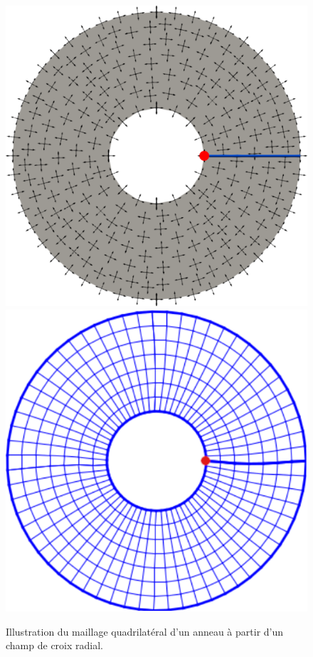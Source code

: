 \begin{figure}[!h]
\centering
\includegraphics[scale=0.3]{images/anneau_cross.pdf}\hfill
\includegraphics[scale=0.89]{images/anneau_mail.pdf}
\caption{Illustration du maillage quadrilatéral d'un anneau à partir d'un champ de croix radial.}
\label{fig:anneau}
\end{figure}

